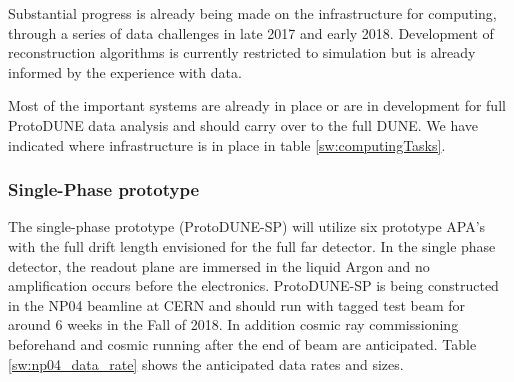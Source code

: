 Substantial progress is already being made on the infrastructure for computing, through a series of data challenges in late 2017 and early 2018. Development of reconstruction algorithms is currently restricted to simulation but is already informed by the experience with   data.


Most of the important systems are already in place or are in development for full ProtoDUNE data analysis and should carry over to the full DUNE.
We have indicated where infrastructure is in place in  table  \ref{sw:computingTasks}.




\subsubsection{Single-Phase prototype}

The single-phase prototype (ProtoDUNE-SP) will utilize six prototype APA's with the full drift length envisioned for the full far detector. In the single phase detector, the readout plane are immersed in the liquid Argon and no amplification occurs before the electronics.    ProtoDUNE-SP is being constructed in the NP04 beamline at CERN and should run with tagged test beam for around 6 weeks in the Fall of 2018.  In addition cosmic ray commissioning beforehand and cosmic running after the end of beam are anticipated.  Table \ref{sw:np04_data_rate}
shows the anticipated data rates and sizes. 


